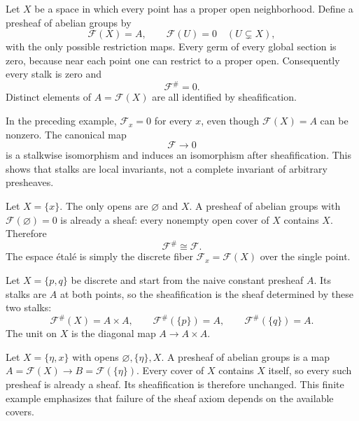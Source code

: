 \begin{example}
Let $X$ be a space in which every point has a proper open neighborhood.  Define a presheaf
of abelian groups by
\[
\mathcal F(X)=A,\qquad \mathcal F(U)=0\quad(U\subsetneq X),
\]
with the only possible restriction maps.  Every germ of every global section is zero,
because near each point one can restrict to a proper open.  Consequently every stalk is
zero and
\[
\mathcal F^\#=0.
\]
Distinct elements of $A=\mathcal F(X)$ are all identified by sheafification.
\end{example}

\begin{example}
In the preceding example, $\mathcal F_x=0$ for every $x$, even though $\mathcal F(X)=A$ can be nonzero.  The canonical map
\[
\mathcal F\to0
\]
is a stalkwise isomorphism and induces an isomorphism after sheafification.  This shows that
stalks are local invariants, not a complete invariant of arbitrary presheaves.
\end{example}

\begin{example}
Let $X=\{x\}$.  The only opens are $\varnothing$ and $X$.  A presheaf of abelian groups with
$\mathcal F(\varnothing)=0$ is already a sheaf: every nonempty open cover of $X$ contains
$X$.  Therefore
\[
\mathcal F^\#\cong\mathcal F.
\]
The espace \'{e}tal\'{e} is simply the discrete fiber $\mathcal F_x=\mathcal F(X)$ over the
single point.
\end{example}

\begin{example}
Let $X=\{p,q\}$ be discrete and start from the naive constant presheaf $A$.  Its stalks are
$A$ at both points, so the sheafification is the sheaf determined by these two stalks:
\[
\mathcal F^\#(X)=A\times A,
\qquad
\mathcal F^\#(\{p\})=A,
\qquad
\mathcal F^\#(\{q\})=A.
\]
The unit on $X$ is the diagonal map $A\to A\times A$.
\end{example}

\begin{example}
Let $X=\{\eta,x\}$ with opens $\varnothing,\{\eta\},X$.  A presheaf of abelian groups is a
map $A=\mathcal F(X)\to B=\mathcal F(\{\eta\})$.  Every cover of $X$ contains $X$ itself,
so every such presheaf is already a sheaf.  Its sheafification is therefore unchanged.  This
finite example emphasizes that failure of the sheaf axiom depends on the available covers.
\end{example}

